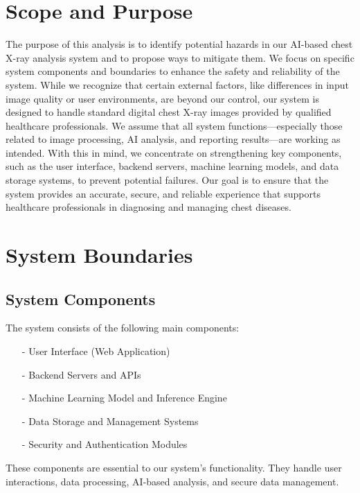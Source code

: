 \documentclass{article}
\begin{document}
\section{Scope and Purpose}

The purpose of this analysis is to identify potential hazards in our AI-based chest X-ray analysis system and to propose ways to mitigate them. We focus on specific system components and boundaries to enhance the safety and reliability of the system. While we recognize that certain external factors, like differences in input image quality or user environments, are beyond our control, our system is designed to handle standard digital chest X-ray images provided by qualified healthcare professionals.
\newline
We assume that all system functions—especially those related to image processing, AI analysis, and reporting results—are working as intended. With this in mind, we concentrate on strengthening key components, such as the user interface, backend servers, machine learning models, and data storage systems, to prevent potential failures. Our goal is to ensure that the system provides an accurate, secure, and reliable experience that supports healthcare professionals in diagnosing and managing chest diseases.

\section{System Boundaries}

\subsection{System Components}

The system consists of the following main components:

\begin{itemize}
    \item[-] User Interface (Web Application)
    \item[-] Backend Servers and APIs
    \item[-] Machine Learning Model and Inference Engine
    \item[-] Data Storage and Management Systems
    \item[-] Security and Authentication Modules
\end{itemize}
These components are essential to our system's functionality. They handle user interactions, data processing, AI-based analysis, and secure data management.
\end{document}
